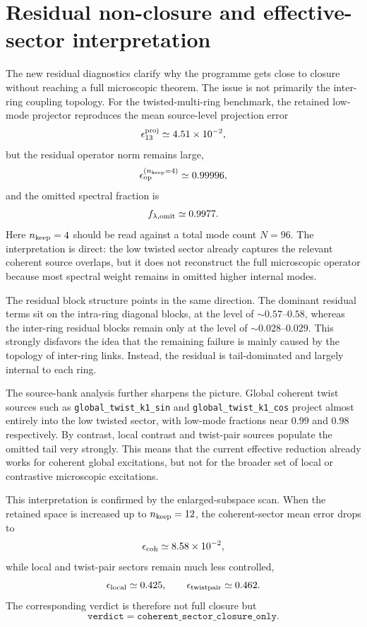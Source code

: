 \documentclass[aps,prd,onecolumn,nofootinbib,superscriptaddress]{revtex4-2}
\begin{document}
\section{Residual non-closure and effective-sector interpretation}
\label{sec:residual}
The new residual diagnostics clarify why the programme gets close to closure without reaching a full microscopic theorem.
The issue is not primarily the inter-ring coupling topology.
For the twisted-multi-ring benchmark, the retained low-mode projector reproduces the mean source-level projection error
\begin{equation}
\epsilon_{13}^{\rm proj}\simeq 4.51\times 10^{-2},
\end{equation}
but the residual operator norm remains large,
\begin{equation}
\epsilon_{\rm op}^{(n_{\rm keep}=4)} \simeq 0.99996,
\end{equation}
and the omitted spectral fraction is
\begin{equation}
f_{\lambda,{\rm omit}}\simeq 0.9977.
\end{equation}
Here $n_{\rm keep}=4$ should be read against a total mode count $N=96$.
The interpretation is direct:
the low twisted sector already captures the relevant coherent source overlaps, but it does not reconstruct the full microscopic operator because most spectral weight remains in omitted higher internal modes.

The residual block structure points in the same direction.
The dominant residual terms sit on the intra-ring diagonal blocks, at the level of $\sim 0.57$--$0.58$, whereas the inter-ring residual blocks remain only at the level of $\sim 0.028$--$0.029$.
This strongly disfavors the idea that the remaining failure is mainly caused by the topology of inter-ring links.
Instead, the residual is tail-dominated and largely internal to each ring.

The source-bank analysis further sharpens the picture.
Global coherent twist sources such as \texttt{global\_twist\_k1\_sin} and \texttt{global\_twist\_k1\_cos} project almost entirely into the low twisted sector, with low-mode fractions near $0.99$ and $0.98$ respectively.
By contrast, local contrast and twist-pair sources populate the omitted tail very strongly.
This means that the current effective reduction already works for coherent global excitations, but not for the broader set of local or contrastive microscopic excitations.

This interpretation is confirmed by the enlarged-subspace scan.
When the retained space is increased up to $n_{\rm keep}=12$, the coherent-sector mean error drops to
\begin{equation}
\epsilon_{\rm coh}\simeq 8.58\times 10^{-2},
\end{equation}
while local and twist-pair sectors remain much less controlled,
\begin{equation}
\epsilon_{\rm local}\simeq 0.425,
\qquad
\epsilon_{\rm twistpair}\simeq 0.462.
\end{equation}
The corresponding verdict is therefore not full closure but
\begin{equation}
\texttt{verdict}=\texttt{coherent\_sector\_closure\_only}.
\end{equation}
\end{document}
